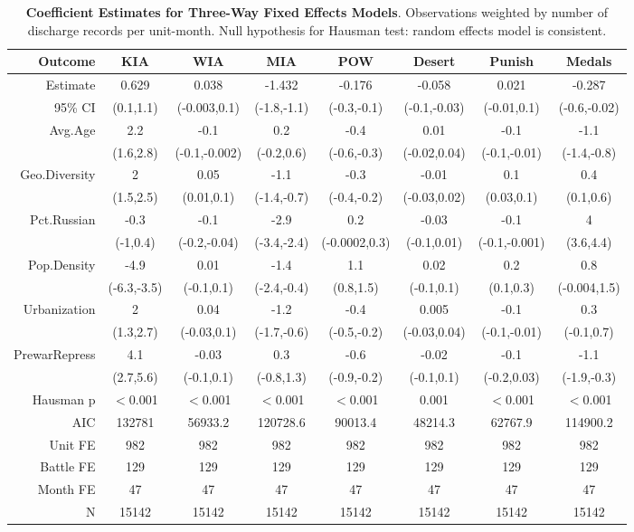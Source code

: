\begin{table}[ht]
\centering
\caption{\textbf{Coefficient Estimates for Three-Way Fixed Effects Models}. Observations weighted by number of discharge records per unit-month. Null hypothesis for Hausman test: random effects model is consistent.} 
\label{tab:fe_pop}
\begingroup\footnotesize
\begin{tabular}{rccccccc}
 Outcome & \textbf{KIA} & \textbf{WIA} & \textbf{MIA} & \textbf{POW} & \textbf{Desert} & \textbf{Punish} & \textbf{Medals} \\ 
  \midrule
Estimate & 0.629 & 0.038 & -1.432 & -0.176 & -0.058 & 0.021 & -0.287 \\ 
  95\% CI & (0.1,1.1) & (-0.003,0.1) & (-1.8,-1.1) & (-0.3,-0.1) & (-0.1,-0.03) & (-0.01,0.1) & (-0.6,-0.02) \\ 
   \midrule
Avg.Age & 2.2 & -0.1 & 0.2 & -0.4 & 0.01 & -0.1 & -1.1 \\ 
   & (1.6,2.8) & (-0.1,-0.002) & (-0.2,0.6) & (-0.6,-0.3) & (-0.02,0.04) & (-0.1,-0.01) & (-1.4,-0.8) \\ 
  Geo.Diversity & 2 & 0.05 & -1.1 & -0.3 & -0.01 & 0.1 & 0.4 \\ 
   & (1.5,2.5) & (0.01,0.1) & (-1.4,-0.7) & (-0.4,-0.2) & (-0.03,0.02) & (0.03,0.1) & (0.1,0.6) \\ 
  Pct.Russian & -0.3 & -0.1 & -2.9 & 0.2 & -0.03 & -0.1 & 4 \\ 
   & (-1,0.4) & (-0.2,-0.04) & (-3.4,-2.4) & (-0.0002,0.3) & (-0.1,0.01) & (-0.1,-0.001) & (3.6,4.4) \\ 
  Pop.Density & -4.9 & 0.01 & -1.4 & 1.1 & 0.02 & 0.2 & 0.8 \\ 
   & (-6.3,-3.5) & (-0.1,0.1) & (-2.4,-0.4) & (0.8,1.5) & (-0.1,0.1) & (0.1,0.3) & (-0.004,1.5) \\ 
  Urbanization & 2 & 0.04 & -1.2 & -0.4 & 0.005 & -0.1 & 0.3 \\ 
   & (1.3,2.7) & (-0.03,0.1) & (-1.7,-0.6) & (-0.5,-0.2) & (-0.03,0.04) & (-0.1,-0.01) & (-0.1,0.7) \\ 
  PrewarRepress & 4.1 & -0.03 & 0.3 & -0.6 & -0.02 & -0.1 & -1.1 \\ 
   & (2.7,5.6) & (-0.1,0.1) & (-0.8,1.3) & (-0.9,-0.2) & (-0.1,0.1) & (-0.2,0.03) & (-1.9,-0.3) \\ 
   \midrule
Hausman p & $<$0.001 & $<$0.001 & $<$0.001 & $<$0.001 & 0.001 & $<$0.001 & $<$0.001 \\ 
  AIC & 132781 & 56933.2 & 120728.6 & 90013.4 & 48214.3 & 62767.9 & 114900.2 \\ 
  Unit FE & 982 & 982 & 982 & 982 & 982 & 982 & 982 \\ 
  Battle FE & 129 & 129 & 129 & 129 & 129 & 129 & 129 \\ 
  Month FE & 47 & 47 & 47 & 47 & 47 & 47 & 47 \\ 
  N & 15142 & 15142 & 15142 & 15142 & 15142 & 15142 & 15142 \\ 
  \end{tabular}
\endgroup
\end{table}
